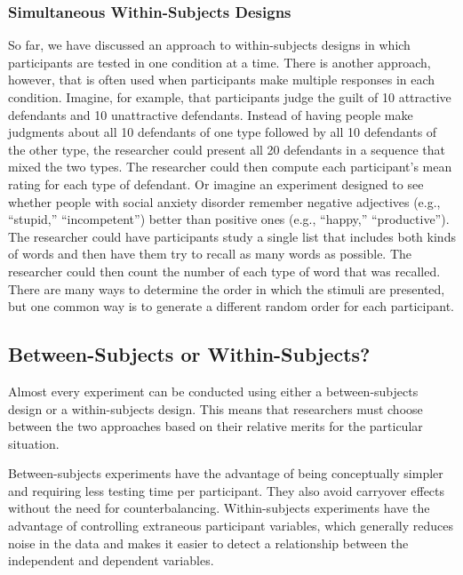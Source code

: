 \documentclass[
]{krantz}
\begin{document}
\subsubsection*{Simultaneous Within-Subjects Designs}\label{simultaneous-within-subjects-designs}


So far, we have discussed an approach to within-subjects designs in which participants are tested in one condition at a time. There is another approach, however, that is often used when participants make multiple responses in each condition. Imagine, for example, that participants judge the guilt of 10 attractive defendants and 10 unattractive defendants. Instead of having people make judgments about all 10 defendants of one type followed by all 10 defendants of the other type, the researcher could present all 20 defendants in a sequence that mixed the two types. The researcher could then compute each participant's mean rating for each type of defendant. Or imagine an experiment designed to see whether people with social anxiety disorder remember negative adjectives (e.g., ``stupid,'' ``incompetent'') better than positive ones (e.g., ``happy,'' ``productive''). The researcher could have participants study a single list that includes both kinds of words and then have them try to recall as many words as possible. The researcher could then count the number of each type of word that was recalled. There are many ways to determine the order in which the stimuli are presented, but one common way is to generate a different random order for each participant.

\subsection*{Between-Subjects or Within-Subjects?}\label{between-subjects-or-within-subjects}


Almost every experiment can be conducted using either a between-subjects design or a within-subjects design. This means that researchers must choose between the two approaches based on their relative merits for the particular situation.

Between-subjects experiments have the advantage of being conceptually simpler and requiring less testing time per participant. They also avoid carryover effects without the need for counterbalancing. Within-subjects experiments have the advantage of controlling extraneous participant variables, which generally reduces noise in the data and makes it easier to detect a relationship between the independent and dependent variables.
\end{document}
